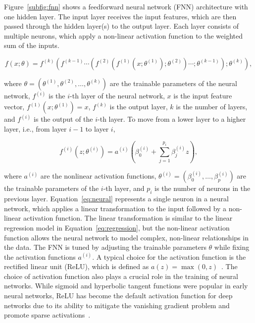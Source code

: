 Figure~\ref{subfig:fnn} shows a feedforward neural network (FNN) architecture with one hidden layer.
The input layer receives the input features, which are then passed through the hidden layer(s) to the output layer.
Each layer consists of multiple neurons, which apply a non-linear activation function to the weighted sum of the inputs.

\begin{equation}
    f(x; \theta) = f^{(k)}(f^{(k-1)} \cdots (f^{(2)}(f^{(1)}(x;\theta^{(1)});\theta^{(2)} )\cdots ;\theta^{(k-1)});\theta^{(k)}),
\end{equation}

where $\theta = (\theta^{(1)}, \theta^{(2)}, \ldots, \theta^{(k)})$ are the trainable parameters of the neural network, $f^{(i)}$ is the $i$-th layer of the neural network, $x$ is the input feature vector, $f^{(1)}(x;\theta^{(1)}) = x$, $f^{(k)}$ is the output layer, $k$ is the number of layers, and $f^{(i)}$ is the output of the $i$-th layer.
To move from a lower layer to a higher layer, i.e., from layer $i-1$ to layer $i$,

\begin{equation} \label{eq:neural}
    f^{(i)}(z;\theta^{(i)}) = a^{(i)}(\beta_0^{(i)} + \sum_{j=1}^{p_i} \beta_j^{(i)} z),
\end{equation}

where $a^{(i)}$ are the nonlinear activation functions, $\theta^{(i)} = (\beta_0^{(i)}, \dots, \beta_p^{(i)})$ are the trainable parameters of the $i$-th layer, and $p_i$ is the number of neurons in the previous layer.
Equation~\ref{eq:neural} represents a single neuron in a neural network, which applies a linear transformation to the input followed by a non-linear activation function. 
The linear transformation is similar to the linear regression model in Equation~\ref{eq:regression}, but the non-linear activation function allows the neural network to model complex, non-linear relationships in the data.
The FNN is tuned by adjusting the trainable parameters $\theta$ while fixing the activation functions $a^{(i)}$.
A typical choice for the activation function is the rectified linear unit (ReLU), which is defined as $a(z) = \max(0, z)$~\citep{nair2010rectified}.
The choice of activation function also plays a crucial role in the training of neural networks.
While sigmoid and hyperbolic tangent functions were popular in early neural networks, ReLU has become the default activation function for deep networks due to its ability to mitigate the vanishing gradient problem and promote sparse activations~\citep{lecun2015deep}.


